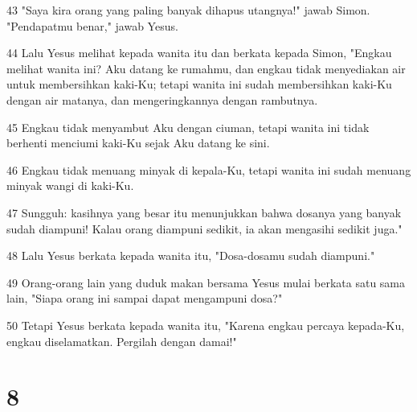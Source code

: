 \par 43 "Saya kira orang yang paling banyak dihapus utangnya!" jawab Simon. "Pendapatmu benar," jawab Yesus.
\par 44 Lalu Yesus melihat kepada wanita itu dan berkata kepada Simon, "Engkau melihat wanita ini? Aku datang ke rumahmu, dan engkau tidak menyediakan air untuk membersihkan kaki-Ku; tetapi wanita ini sudah membersihkan kaki-Ku dengan air matanya, dan mengeringkannya dengan rambutnya.
\par 45 Engkau tidak menyambut Aku dengan ciuman, tetapi wanita ini tidak berhenti menciumi kaki-Ku sejak Aku datang ke sini.
\par 46 Engkau tidak menuang minyak di kepala-Ku, tetapi wanita ini sudah menuang minyak wangi di kaki-Ku.
\par 47 Sungguh: kasihnya yang besar itu menunjukkan bahwa dosanya yang banyak sudah diampuni! Kalau orang diampuni sedikit, ia akan mengasihi sedikit juga."
\par 48 Lalu Yesus berkata kepada wanita itu, "Dosa-dosamu sudah diampuni."
\par 49 Orang-orang lain yang duduk makan bersama Yesus mulai berkata satu sama lain, "Siapa orang ini sampai dapat mengampuni dosa?"
\par 50 Tetapi Yesus berkata kepada wanita itu, "Karena engkau percaya kepada-Ku, engkau diselamatkan. Pergilah dengan damai!"

\chapter{8}

